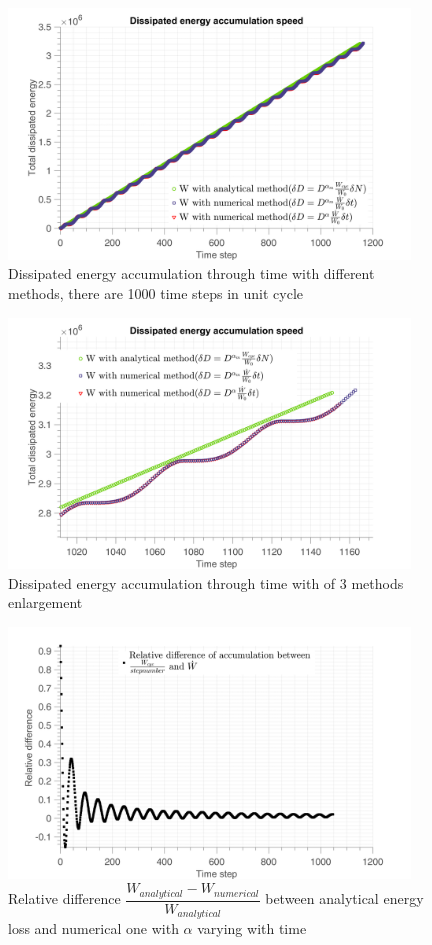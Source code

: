 \documentclass[3p,times,number,review]{elsarticle}
\begin{document}
\begin{figure}[!h]
\centering
\includegraphics[width=0.95\textwidth]{figures//W_3methods2_100steps.png} 
\caption{Dissipated energy accumulation through time with different methods, there are 1000 time steps in unit cycle}
\label{fig.W3methods1000}
\end{figure}
\begin{figure}[!h]
\centering
\includegraphics[width=0.95\textwidth]{figures//W_3methods_100steps_enlarge.png} 
\caption{Dissipated energy accumulation through time with of 3 methods enlargement}
\label{fig.W3methods2enlarge}
\end{figure}
\begin{figure}[!h]
\centering
\includegraphics[width=0.95\textwidth]{figures//W_3methods_diff_100steps.png} 
\caption{Relative difference $\dfrac{W_{analytical}-W_{numerical}}{W_{analytical}}$ between analytical energy loss and numerical one with $\alpha$ varying with time}
\label{fig.W3methodsdiff}
\end{figure}
\end{document}
